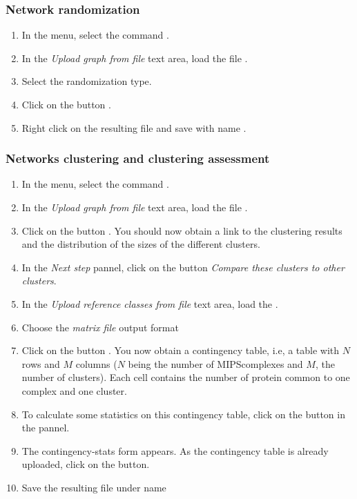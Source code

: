 \subsubsection{Network randomization}

\begin{enumerate}

\item In the \neat menu, select the command . 
\item In the \textit{Upload graph from file} text area, load the file .
\item Select the  randomization type.
\item Click on the button . 
\item Right click on the resulting file and save with name .

\end{enumerate}

\subsubsection{Networks clustering and clustering assessment}

\begin{enumerate}

\item In the \neat menu, select the command . 
\item In the \textit{Upload graph from file} text area, load the file .
\item Click on the button . You should now obtain a link to the clustering results and the distribution of the sizes of the different clusters.
\item In the \textit{Next step} pannel, click on the button \textit{Compare these clusters to other clusters}.
\item In the \textit{Upload reference classes from file } text area, load the .
\item Choose the \textit{matrix file} output format
\item Click on the button . You now obtain a contingency table, i.e, a table with $N$ rows and $M$ columns ($N$ being the number of MIPScomplexes and $M$, the number of clusters). Each cell contains the number of protein common to one complex and one cluster.
\item To calculate some statistics on this contingency table, click on the  button in the  pannel.
\item The contingency-stats form appears. As the contingency table is already uploaded, click on the  button. 
\item Save the resulting file under name  

\end{enumerate}

